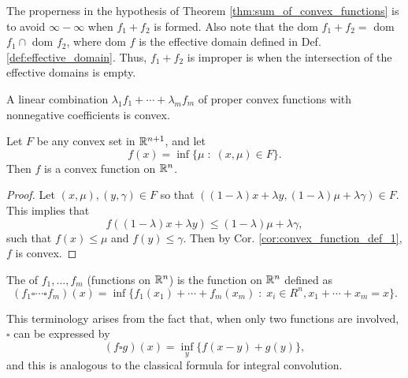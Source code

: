 \documentclass[11pt,a4paper]{article}
\begin{document}
\begin{remark}
    The properness in the hypothesis of Theorem \ref{thm:sum_of_convex_functions} is to avoid $\infty-\infty$ when $f_1+f_2$ is formed. Also note that the dom $f_1+f_2 =$ dom $f_1\cap$ dom $f_2$, where dom $f$ is the effective domain defined in Def. \ref{def:effective_domain}. Thus, $f_1+f_2$ is improper is when the intersection of the effective domains is empty. 
\end{remark}

\begin{corollary}
    A linear combination $\lambda_1 f_1+\cdots + \lambda_m f_m$ of proper convex functions with nonnegative coefficients is convex.
\end{corollary}

\begin{theorem}\label{thm:convex_set_inf_convex_function}
    Let $F$ be any convex set in $\mathbb{R}^{n+1}$, and let 
    \begin{equation*}
        f(x) = \inf\{\mu\;:\;(x,\mu)\in F\}.
    \end{equation*}
    Then $f$ is a convex function on $\mathbb{R}^n$.
\end{theorem}

\begin{proof}
    Let $(x,\mu),(y,\gamma)\in F$ so that $((1-\lambda)x+\lambda y, (1-\lambda)\mu+\lambda \gamma)\in F$. This implies that
    \begin{equation}\label{eqn:}
        f((1-\lambda)x+\lambda y) \le (1-\lambda)\mu+\lambda \gamma,
    \end{equation} 
    such that $f(x)\le \mu$ and $f(y)\le \gamma$. Then by Cor. \ref{cor:convex_function_def_1}, $f$ is convex.
\end{proof}

\begin{definition}
    The  of $f_1,\ldots,f_m$ (functions on $\mathbb{R}^n$) is the function on $\mathbb{R}^n$ defined as 
    \begin{equation*}
        (f_1\square \cdots \square f_m)(x) = \inf\{f_1(x_1)+\cdots + f_m(x_m)\;:\;x_i\in R^n,x_1+\cdots+x_m = x\}.
    \end{equation*} 
\end{definition}

\begin{remark}
    This terminology arises from the fact that, when only two functions are involved, $\square$ can be expressed by
    \begin{equation*}
        (f\square g)(x) = \inf_{y} \{f(x-y)+g(y)\},
    \end{equation*}
    and this is analogous to the classical formula for integral convolution.
\end{remark}
\end{document}

